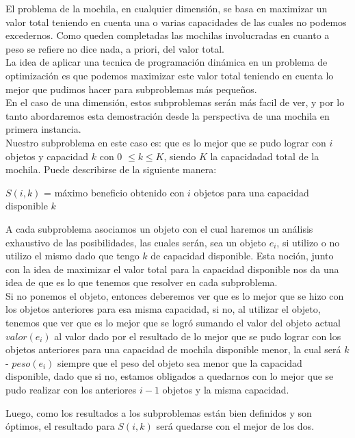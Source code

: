 El problema de la mochila, en cualquier dimensi\'on, se basa en maximizar un valor total teniendo en cuenta una o varias capacidades de las cuales no podemos excedernos. Como queden completadas las mochilas involucradas en cuanto a peso se refiere no dice nada, a priori, del valor total.\\

La idea de aplicar una tecnica de programación dinámica en un problema de optimización es que podemos maximizar este valor total teniendo en cuenta lo mejor que pudimos hacer para subproblemas m\'as pequeños.\\

En el caso de una dimensi\'on, estos subproblemas serán más facil de ver, y por lo tanto abordaremos esta demostración desde la perspectiva de una mochila en primera instancia.\\

Nuestro subproblema en este caso es: que es lo mejor que se pudo lograr con $i$ objetos y capacidad $k$ con 0 $\leq k \leq K$, siendo $K$ la capacidadad total de la mochila.
Puede describirse de la siguiente manera:

\begin{center}
$S(i, k)$ = máximo beneficio obtenido con $i$ objetos para una capacidad disponible $k$
\end{center}

A cada subproblema asociamos un objeto con el cual haremos un análisis exhaustivo de las posibilidades, las cuales serán, sea un objeto $e_i$, si utilizo o no utilizo el mismo dado que tengo $k$ de capacidad disponible.
Esta noción, junto con la idea de maximizar el valor total para la capacidad disponible nos da una idea de que es lo que tenemos que resolver en cada subproblema. \\

Si no ponemos el objeto, entonces deberemos ver que es lo mejor que se hizo con los objetos anteriores para esa misma capacidad, si no, al utilizar el objeto, tenemos que ver que es lo mejor que se logró sumando el valor del objeto actual $valor(e_i)$ al valor dado por el resultado de lo mejor que se pudo lograr con los objetos anteriores para una capacidad de mochila disponible menor, la cual será $k$ - $peso(e_i)$ siempre que el peso del objeto sea menor que la capacidad disponible, dado que si no, estamos obligados a quedarnos con lo mejor que se pudo realizar con los anteriores $i-1$ objetos y la misma capacidad.

Luego, como los resultados a los subproblemas están bien definidos y son óptimos, el resultado para $S(i, k)$ será quedarse con el mejor de los dos.

